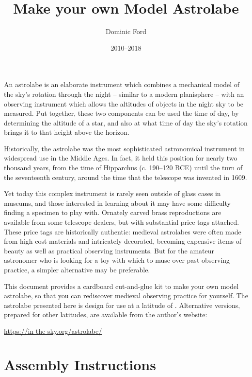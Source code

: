 \documentclass[a4paper,onecolumn,10pt]{article}
\title{Make your own Model Astrolabe}
\author{Dominic Ford}
\date{2010--2018}
\begin{document}
\maketitle
\setcounter{footnote}{1}

An astrolabe is an elaborate instrument which combines a mechanical model of
the sky's rotation through the night -- similar to a modern planisphere
-- with an observing instrument which allows the altitudes of objects in
the night sky to be measured. Put together, these two components can be used
the time of day, by determining the altitude of a star, and also at what time
of day the sky's rotation brings it to that height above the horizon.

Historically, the astrolabe was the most sophisticated astronomical instrument
in widespread use in the Middle Ages.  In fact, it held this position for
nearly two thousand years, from the time of Hipparchus (c. 190--120 BCE)
until the turn of the seventeenth century, around the time that the telescope
was invented in 1609.

Yet today this complex instrument is rarely seen outside of glass cases in
museums, and those interested in learning about it may have some difficulty
finding a specimen to play with. Ornately carved brass reproductions are
available from some telescope dealers, but with substantial price tags
attached. These price tags are historically authentic: medieval astrolabes
were often made from high-cost materials and intricately decorated, becoming
expensive items of beauty as well as practical observing instruments. But for
the amateur astronomer who is looking for a toy with which to muse over past
observing practice, a simpler alternative may be preferable.

This document provides a cardboard cut-and-glue kit to make your own model
astrolabe, so that you can rediscover medieval observing practice for yourself.
The astrolabe presented here is design for use at a latitude of
. Alternative versions, prepared for other latitudes, are
available from the author's website:

\centerline{\url{https://in-the-sky.org/astrolabe/}}

\section*{Assembly Instructions}
\end{document}

